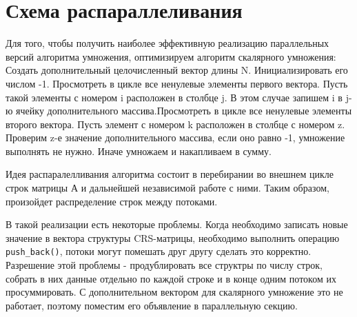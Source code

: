 \documentclass{report}
\begin{document}
\section* {Схема распараллеливания}
Для того, чтобы получить наиболее эффективную реализацию параллельных версий алгоритма умножения, оптимизируем алгоритм скалярного умножения:
\newline{}\quad Создать дополнительный целочисленный вектор длины N. Инициализировать его числом -1. \newline{}\quad Просмотреть в цикле все ненулевые элементы первого вектора. Пусть такой элементы с номером i расположен в столбце j. В этом случае запишем i в j-ю ячейку дополнительного массива.\newline{}\quad Просмотреть в цикле все ненулевые элементы второго вектора. Пусть элемент с номером k расположен в столбце с номером z. Проверим z-е значение дополнительного массива, если оно равно -1, умножение выполнять не нужно. Иначе умножаем и накапливаем в сумму.\par
Идея распаралелливания алгоритма состоит в перебирании во внешнем цикле строк матрицы А и дальнейшей независимой работе с ними. Таким образом, произойдет распределение строк между потоками. 
\par В такой реализации есть некоторые проблемы. Когда необходимо записать новые значение в вектора структуры CRS-матрицы, необходимо выполнить операцию \verb|push_back()|, потоки могут помешать друг другу сделать это корректно. Разрешение этой проблемы - продублировать все структры по числу строк, собрать в них данные отдельно по каждой строке и в конце одним потоком их просуммировать. С дополнительном вектором для скалярного умножение это не работает, поэтому поместим его объявление в параллельную секцию. 
\newpage
\end{document}
